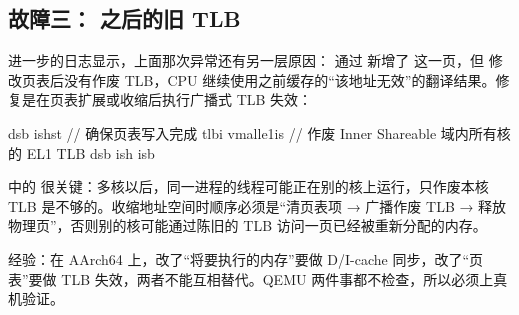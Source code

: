\subsection{故障三： 之后的旧 TLB}

进一步的日志显示，上面那次异常还有另一层原因： 通过  新增了  这一页，但  修改页表后没有作废 TLB，CPU 继续使用之前缓存的“该地址无效”的翻译结果。修复是在页表扩展或收缩后执行广播式 TLB 失效：

\begin{asmcode}
        dsb  ishst          // 确保页表写入完成
        tlbi vmalle1is      // 作废 Inner Shareable 域内所有核的 EL1 TLB
        dsb  ish
        isb
\end{asmcode}

 中的  很关键：多核以后，同一进程的线程可能正在别的核上运行，只作废本核 TLB 是不够的。收缩地址空间时顺序必须是“清页表项 → 广播作废 TLB → 释放物理页”，否则别的核可能通过陈旧的 TLB 访问一页已经被重新分配的内存。

\begin{note}
  经验：在 AArch64 上，改了“将要执行的内存”要做 D/I-cache 同步，改了“页表”要做 TLB 失效，两者不能互相替代。QEMU 两件事都不检查，所以必须上真机验证。
\end{note}
